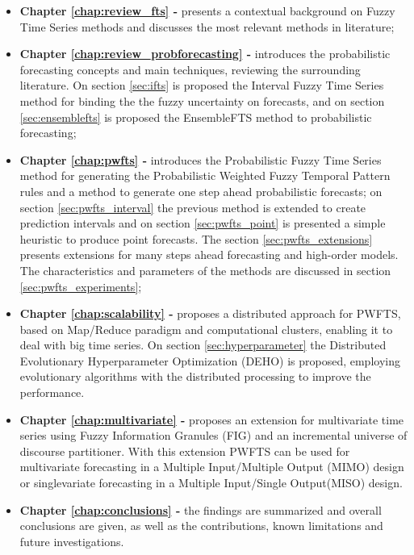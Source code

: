\begin{itemize}
\item \textbf{Chapter \ref{chap:review_fts} -  } presents a contextual background on Fuzzy Time Series methods and discusses the most relevant methods in literature;

\item \textbf{Chapter \ref{chap:review_probforecasting} -  } introduces the probabilistic forecasting concepts and main techniques, reviewing the surrounding literature. On section \ref{sec:ifts} is proposed the Interval Fuzzy Time Series method for binding the the fuzzy uncertainty on forecasts, and on section \ref{sec:ensemblefts} is proposed the EnsembleFTS method to probabilistic forecasting;

\item \textbf{Chapter \ref{chap:pwfts} - } introduces the Probabilistic Fuzzy Time Series method for generating the Probabilistic Weighted Fuzzy Temporal Pattern rules and a method to generate one step ahead probabilistic forecasts; on section \ref{sec:pwfts_interval} the previous method is extended to create prediction intervals and on section \ref{sec:pwfts_point} is presented a simple heuristic to produce point forecasts. The section \ref{sec:pwfts_extensions} presents extensions for many steps ahead forecasting and high-order models. The characteristics and parameters of the methods are discussed in section \ref{sec:pwfts_experiments};

\item \textbf{Chapter \ref{chap:scalability} - } proposes a distributed approach for PWFTS, based on Map/Reduce paradigm and computational clusters, enabling it to deal with big time series. On section \ref{sec:hyperparameter} the Distributed Evolutionary Hyperparameter Optimization (DEHO) is proposed, employing evolutionary algorithms with the distributed processing to improve the performance.

\item \textbf{Chapter \ref{chap:multivariate} - } proposes an extension for multivariate time series using Fuzzy Information Granules (FIG) and an incremental universe of discourse partitioner. With this extension PWFTS can be used for multivariate forecasting in a Multiple Input/Multiple Output (MIMO) design or singlevariate forecasting in a Multiple Input/Single Output(MISO) design.


\item \textbf{Chapter \ref{chap:conclusions} - } the findings are summarized and overall conclusions are given, as well as the contributions, known limitations and future investigations. 
\end{itemize}

